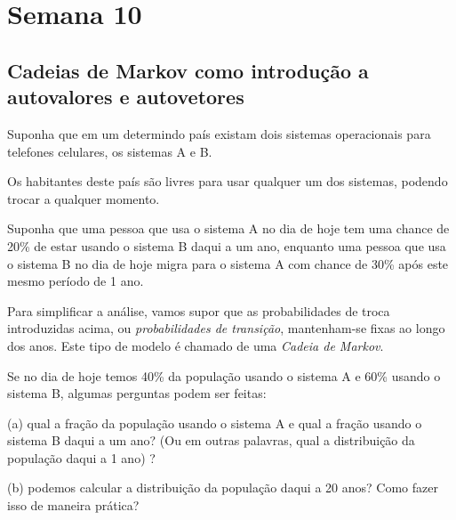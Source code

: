 

\providecommand{\dir}{..}


%

\chapter{Semana 10}


\section{Cadeias de Markov como introdução a autovalores e autovetores}

Suponha que em um determindo país existam dois sistemas operacionais para telefones celulares, os sistemas A e B.

Os habitantes deste país são livres para usar qualquer um dos sistemas, podendo trocar a qualquer momento.

Suponha que uma pessoa que usa o sistema A no dia de hoje tem uma chance de  20\% de estar usando  o sistema B daqui a um ano, enquanto uma pessoa que usa o sistema B no dia de hoje migra para o sistema A com chance de 30\% após este mesmo período de 1 ano.

Para simplificar a análise, vamos supor que as probabilidades de troca introduzidas acima, ou  {\it probabilidades de transição}, mantenham-se fixas ao longo dos anos.
Este tipo de modelo é chamado de uma {\it Cadeia de Markov}.

Se no dia de hoje temos 40\% da população usando o sistema A e 60\% usando o sistema B, algumas perguntas podem ser feitas:

\medskip


(a) qual a fração da população usando o sistema A e qual a fração usando o sistema B daqui a um ano? (Ou em outras palavras, qual a distribuição da população daqui a 1 ano) ?

(b) podemos calcular a distribuição da população daqui a 20 anos? Como fazer isso de maneira prática?

